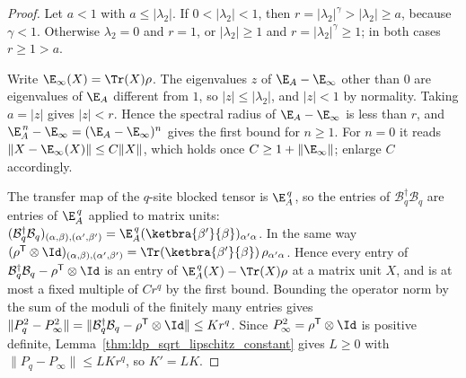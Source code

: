 \begin{proof}
    \leanok
    Let $a<1$ with $a\le\lvert\lambda_2\rvert$. If
    $0<\lvert\lambda_2\rvert<1$, then
    $r=\lvert\lambda_2\rvert^{\gamma}>\lvert\lambda_2\rvert\ge a$,
    because $\gamma<1$. Otherwise $\lambda_2=0$ and $r=1$, or
    $\lvert\lambda_2\rvert\ge1$ and $r=\lvert\lambda_2\rvert^{\gamma}\ge1$;
    in both cases $r\ge1>a$.

    Write $\E_\infty(X)=\Tr(X)\rho$. The eigenvalues $z$ of
    $\E_A-\E_\infty$ other than $0$ are eigenvalues of $\E_A$ different from
    $1$, so $\lvert z\rvert\le\lvert\lambda_2\rvert$, and
    $\lvert z\rvert<1$ by normality. Taking $a=\lvert z\rvert$ gives
    $\lvert z\rvert<r$. Hence the spectral radius of
    $\E_A-\E_\infty$ is less than $r$, and
    $\E_A^{\,n}-\E_\infty=(\E_A-\E_\infty)^n$ gives the first bound for
    $n\ge1$. For $n=0$ it reads
    $\lVert X-\E_\infty(X)\rVert\le C\lVert X\rVert$, which holds once
    $C\ge1+\lVert\E_\infty\rVert$; enlarge $C$ accordingly.

    The transfer map of the $q$-site blocked tensor is $\E_A^{\,q}$, so the
    entries of $\mathcal B_q^\dagger\mathcal B_q$ are entries of $\E_A^{\,q}$
    applied to matrix units:
    $(\mathcal B_q^\dagger\mathcal B_q)_{(\alpha,\beta),(\alpha',\beta')}
        =\E_A^{\,q}(\ketbra{\beta'}{\beta})_{\alpha'\alpha}$. In the same way
    $(\rho^{\mathsf T}\otimes\Id)_{(\alpha,\beta),(\alpha',\beta')}
        =\Tr(\ketbra{\beta'}{\beta})\,\rho_{\alpha'\alpha}$. Hence every entry
    of $\mathcal B_q^\dagger\mathcal B_q-\rho^{\mathsf T}\otimes\Id$ is an
    entry of $\E_A^{\,q}(X)-\Tr(X)\rho$ at a matrix unit $X$, and is at most
    a fixed multiple of $Cr^q$ by the first bound. Bounding the operator norm
    by the sum of the moduli of the finitely many entries gives
    $\lVert P_q^2-P_\infty^2\rVert
        =\lVert\mathcal B_q^\dagger\mathcal B_q-\rho^{\mathsf T}\otimes\Id\rVert
        \le Kr^q$. Since
    $P_\infty^2=\rho^{\mathsf T}\otimes\Id$ is positive definite,
    Lemma~\ref{thm:ldp_sqrt_lipschitz_constant} gives $L\ge0$ with
    $\lVert P_q-P_\infty\rVert\le LKr^q$, so $K'=LK$.
\end{proof}


